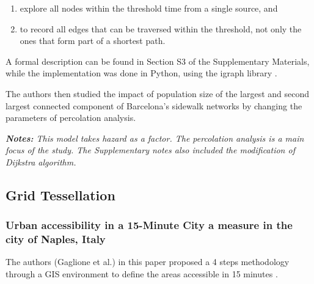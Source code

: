\begin{enumerate}
\item explore all nodes within the threshold time from a single source, and
\item to record all edges that can be traversed within the threshold, not only the ones that form part of a shortest path.
\end{enumerate}

A formal description can be found in Section S3 of the Supplementary Materials, while the implementation was done in Python, using the {igraph} library \cite{igraph}.

The authors then studied the impact of population size of the largest and second largest connected component of Barcelona's sidewalk networks by changing the parameters of percolation analysis.

\textit{\textbf{Notes:} This model takes hazard as a factor. The percolation analysis is a main focus of the study. The Supplementary notes also included the modification of Dijkstra algorithm.}

\subsection{Grid Tessellation}

\subsubsection{Urban accessibility in a 15-Minute City a measure in the city of Naples, Italy}

The authors (Gaglione et al.) in this paper proposed a 4 steps methodology through a GIS environment to define the areas accessible in 15 minutes \cite{gaglione_urban_2022}.


